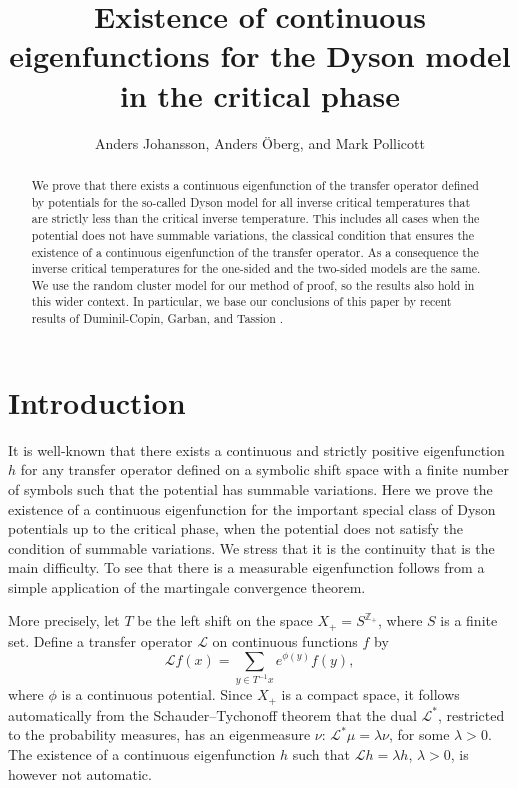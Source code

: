 \documentclass[11pt, a4paper]{amsart}
\title[Existence of continuous eigenfunction]{Existence of continuous eigenfunctions for the Dyson model in the critical phase}
\author{Anders Johansson, Anders \"Oberg, and Mark Pollicott}
\date{}
\theoremstyle{definition}
\theoremstyle{remark}
\begin{document}
\maketitle
\begin{abstract}
We prove that there exists a continuous eigenfunction of the transfer operator defined by potentials for the so-called Dyson model for all inverse critical temperatures that are strictly less than the critical inverse temperature. This includes all cases when the potential does not have summable variations, the classical condition that ensures the existence of a continuous eigenfunction of the transfer operator. As a consequence the inverse critical temperatures for the one-sided and the two-sided models are the same. We use the random cluster model for our method of proof, so the results also hold in this wider context. In particular, we base our conclusions of this paper by recent results of Duminil-Copin, Garban, and Tassion \cite{duminil}.
\end{abstract}
\def\h{h}


\section{Introduction}\noindent

It is well-known \cite{walters1} that there exists a continuous and strictly positive
eigenfunction $h$ for any transfer operator defined on a symbolic shift space
with a finite number of symbols such that the potential has summable variations.
Here we prove the existence of a continuous eigenfunction for the important special class
of Dyson potentials up to the critical phase, when the potential does not
satisfy the condition of summable variations. We stress that it is the continuity that is the main difficulty. 
To see that there is a measurable eigenfunction follows from a simple application of the martingale 
convergence theorem.

More precisely, let $T$ be the left shift on the space $X_+=S^{{\mathbb Z}_+}$,
where $S$ is a finite set. Define a transfer operator ${\mathcal L}$ on
continuous functions $f$ by
\begin{equation}\label{trans} {\mathcal L} f(x)= \sum_{y\in T^{-1}x}
  e^{\phi(y)}f(y),
\end{equation}
where $\phi$ is a continuous potential. Since $X_+$ is a compact space, it
follows automatically from the Schauder--Tychonoff theorem that the dual
${\mathcal L}^*$, restricted to the probability measures, has an eigenmeasure
$\nu$: ${\mathcal L}^* \mu=\lambda \nu$, for some $\lambda>0$. The existence of
a continuous eigenfunction $h$ such that ${\mathcal L}h=\lambda h$, $\lambda>0$,
is however not automatic. 
\end{document}
